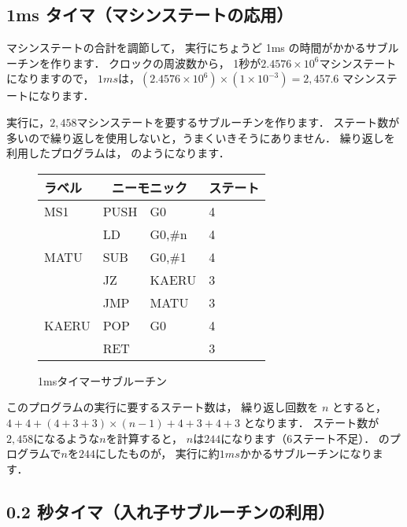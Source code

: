 \subsection{1ms タイマ（マシンステートの応用）}
\label{ms}

マシンステートの合計を調節して，
実行にちょうど 1ms の時間がかかるサブルーチンを作ります．
クロックの周波数から，
1秒が$2.4576 \times 10^{6}$マシンステートになりますので，
$1ms$は，$(2.4576 \times 10^{6}) \times (1 \times 10^{-3}) = 2,457.6$
マシンステートになります．

実行に，$2,458$マシンステートを要するサブルーチンを作ります．
ステート数が多いので繰り返しを使用しないと，うまくいきそうにありません．
繰り返しを利用したプログラムは，
のようになります．

\begin{figure}[btp]
{\small\tt\begin{center}
\begin{tabular}{|l|l l|l|} \hline
ラベル & \multicolumn{2}{|c|}{ニーモニック}& ステート \\
\hline
MS1   & PUSH & G0            & 4   \\
      & LD   & G0,\#n        & 4   \\
MATU  & SUB  & G0,\#1        & 4   \\
      & JZ   & KAERU         & 3   \\
      & JMP  & MATU          & 3   \\
KAERU & POP  & G0            & 4   \\
      & RET  &               & 3   \\
\hline
\end{tabular}
\end{center}}
\caption{1msタイマーサブルーチン}
\label{fig:chap6:1ms}
\end{figure}

このプログラムの実行に要するステート数は，
繰り返し回数を $n$ とすると，
$ 4 + 4 + ( 4 + 3 + 3 ) \times (n - 1) + 4 + 3 + 4 + 3$
となります．
ステート数が$2,458$になるような$n$を計算すると，
$n$は$244$になります（6ステート不足）．
のプログラムで$n$を$244$にしたものが，
実行に約$1ms$かかるサブルーチンになります．

\subsection{0.2 秒タイマ（入れ子サブルーチンの利用）}
\label{ms200}

